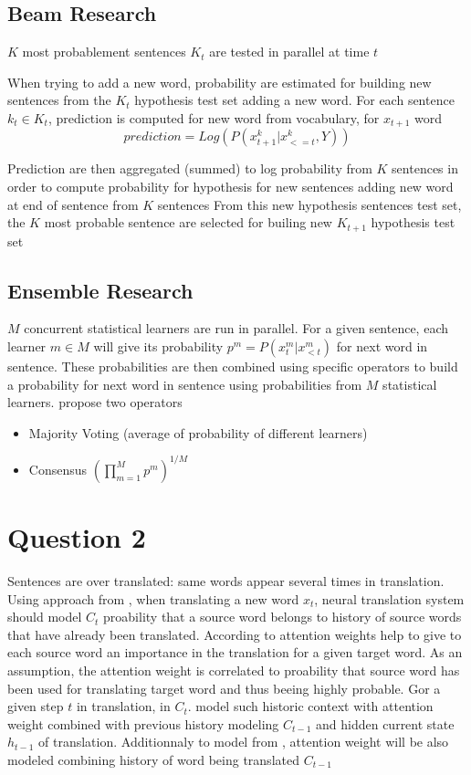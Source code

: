 \documentclass[a4paper]{article}
\begin{document}
\subsection{Beam Research}
$K$ most probablement sentences $K_{t}$ are tested in parallel at time $t$

When trying to add a new word, probability are estimated for building new sentences from the $K_{t}$ hypothesis test set adding a new word. For each sentence $k_{t} \in K_{t}$, prediction is computed for new word from vocabulary, for $x_{t+1}$ word
\begin{equation}
prediction = Log(P(x_{t+1}^{k} \vert x_{<=t}^{k},Y))
\end{equation}

Prediction are then aggregated (summed) to log probability from $K$ sentences in order to compute probability for hypothesis for new sentences adding new word at end of sentence from $K$ sentences
From this new hypothesis sentences test set, the $K$ most probable sentence are selected for builing new $K_{t+1}$ hypothesis test set 

\subsection{ Ensemble Research}

$M$ concurrent statistical learners are run in parallel. For a given sentence, each learner $m \in M$ will give its probability $p^{m} = P(x_{t}^{m} \vert x_{<t}^{m})$ for next word in sentence. These probabilities are then combined using specific operators to build a probability for next word in sentence using probabilities from $M$ statistical learners. \citep{luong2016} propose two operators
\begin{itemize}
\item Majority Voting (average of probability of different learners)
\item Consensus $(\prod_{m=1}^{M} p^{m})^{1 / M}$

\end{itemize}





\section{Question 2}
Sentences are over translated: same words appear several times in translation. Using approach from \cite{zhaopeng2016}, when translating a new word $x_{t}$, neural translation system should model $C_{t}$ proability that a source word belongs to history of source words that have already been translated. According to \citep{luong2015} attention weights help to give to each source word an importance in the translation for a given target word. As an assumption, the attention weight is correlated to proability that source word has been used for translating target word and thus beeing highly probable. Gor a given step $t$ in translation, in $C_{t}$. \citep{zhaopeng2016} model such historic context with attention weight combined with previous history modeling $C_{t-1}$ and hidden current state $h_{t-1}$ of translation. Additionnaly to model from \citep{luong2015}, attention weight will be also modeled combining history of word being translated $C_{t-1}$
\end{document}
